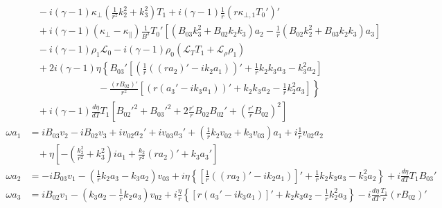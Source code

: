 \documentclass[11pt, fleqn]{article}
\newcommand{\HL}{\mathscr{L}}
\begin{document}
\begin{equation}
\begin{aligned}
					      &~~~~ - i(\gamma - 1)\kappa_\bot\left(\frac{1}{r^2}k_2^2 + k_3^2\right)T_1 + i(\gamma - 1)\frac{1}{r}(r\kappa_{\bot, 1}T_0')'																					\\
						  &~~~~ + i(\gamma - 1)(\kappa_\bot - \kappa_\parallel)\frac{1}{B^2}T_0'\left[(B_{03}k_3^2 + B_{02}k_2k_3)a_2 - \frac{1}{r}(B_{02}k_2^2 + B_{03}k_2k_3)a_3\right]													\\
						  &~~~~ - i(\gamma - 1)\rho_1\HL_0 - i(\gamma - 1)\rho_0(\HL_T T_1 + \HL_\rho \rho_1)																															\\
						  &~~~~ +2i(\gamma - 1)\eta\left\{B_{03}'\left[\left(\frac{1}{r}\left((ra_2)' - ik_2a_1\right)\right)' + \frac{1}{r}k_2k_3a_3 - k_3^2a_2\right]\right.															\\
						  &~~~~ \left. \qquad\qquad\qquad  ~ -\frac{(rB_{02})'}{r^2}\left[\left(r(a_3' - ik_3a_1)\right)' + k_2k_3a_2 - \frac{1}{r}k_2^2a_3\right] \right\} 															\\
						  &~~~~ + i(\gamma - 1)\frac{d\eta}{dT}T_1\left[B_{02}'^2 + B_{03}'^2 + 2\frac{r'}{r}B_{02}B_{02}' + \left(\frac{r'}{r}B_{02}\right)^2\right]												      				\\[8pt]
		\omega a_1		  &= iB_{03}v_2 - iB_{02}v_3 + iv_{02}a_2' + iv_{03}a_3' + \left(\frac{1}{r}k_2v_{02} + k_3v_{03}\right)a_1 + i\frac{1}{r}v_{02}a_2																				\\
						  &~~~~ + \eta\left[-\left(\frac{k_2^2}{r^2} + k_3^2\right) ia_1 + \frac{k_2}{r^2}(ra_2)' + k_3a_3'\right]							  																			\\[8pt]
		\omega a_2		  &= -iB_{03}v_1 - \left(\frac{1}{r}k_2a_3 - k_3a_2\right)v_{03} + i\eta\left\{\left[\frac{1}{r}\left((ra_2)' - ik_2a_1\right)\right]' + \frac{1}{r}k_2k_3a_3 - k_3^2a_2\right\} + i\frac{d\eta}{dT}T_1B_{03}'	\\[8pt]
		\omega a_3		  &=  iB_{02}v_1 - \left(k_3a_2 - \frac{1}{r}k_2a_3\right)v_{02} + i\frac{\eta}{r}\left\{\left[r(a_3' - ik_3a_1)\right]' + k_2k_3a_2 - \frac{1}{r}k_2^2a_3\right\} - i\frac{d\eta}{dT}\frac{T_1}{r}(rB_{02})'	
	\end{aligned}
\end{equation}

\newpage
\end{document}
